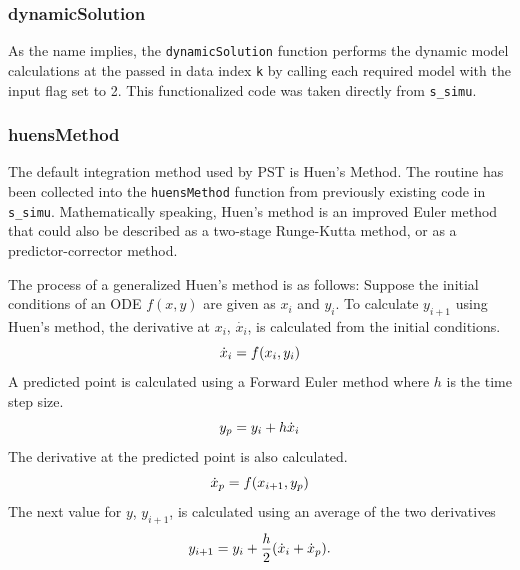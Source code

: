 \subsubsection{dynamicSolution}  
As the name implies, the \verb|dynamicSolution| function performs the dynamic model calculations at  the passed in data index \verb|k| by calling each required model with the input flag set to 2.
This functionalized code was taken directly from \verb|s_simu|.


\subsubsection{huensMethod}  
The default integration method used by PST is Huen's Method.
The routine has been collected into the \verb|huensMethod| function from previously existing code in \verb|s_simu|.
Mathematically speaking, Huen's method is an improved Euler method that could also be described as a two-stage Runge-Kutta method, or as a predictor-corrector method.

The process of a generalized Huen's method is as follows:
Suppose the initial conditions of an ODE $f(x,y)$ are given as $x_i$ and $y_i$.
To calculate $y_{i+1}$ using Huen's method, the derivative at $x_i$, $\dot{x_i}$, is calculated from the initial conditions.
\begin{equation}{\label{eq: huens1} }
\dot{x}_i = f(x_i, y_i)
\end{equation} 
\noindent A predicted point is calculated using a Forward Euler method where $h$ is the time step size.
\begin{equation}{\label{eq: huens2} }
y_p = y_i + h \dot{x}_i
\end{equation} 
\noindent The derivative at the predicted point is also calculated.
\begin{equation}{\label{eq: huens3} }
\dot{x}_p = f(x_{i+1}, y_p)
\end{equation} 
\noindent The next value for $y$, $y_{i+1}$, is calculated using an average of the two derivatives
\begin{equation}{\label{eq: huens4} }
y_{i+1} = y_i + \frac{h}{2}( \dot{x}_i + \dot{x}_p ).
\end{equation} 

